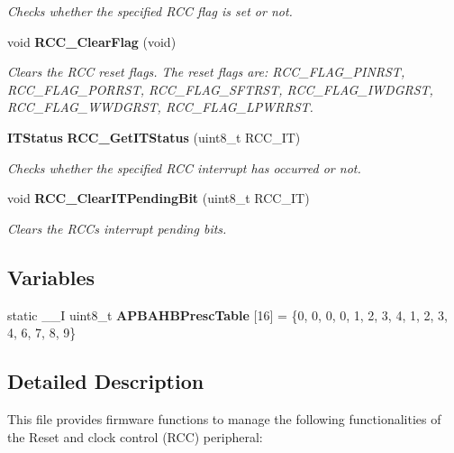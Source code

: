 \begin{DoxyCompactItemize}
\begin{DoxyCompactList}\small\item\em Checks whether the specified R\+CC flag is set or not. \end{DoxyCompactList}\item 
void \textbf{ R\+C\+C\+\_\+\+Clear\+Flag} (void)
\begin{DoxyCompactList}\small\item\em Clears the R\+CC reset flags. The reset flags are\+: R\+C\+C\+\_\+\+F\+L\+A\+G\+\_\+\+P\+I\+N\+R\+ST, R\+C\+C\+\_\+\+F\+L\+A\+G\+\_\+\+P\+O\+R\+R\+ST, R\+C\+C\+\_\+\+F\+L\+A\+G\+\_\+\+S\+F\+T\+R\+ST, R\+C\+C\+\_\+\+F\+L\+A\+G\+\_\+\+I\+W\+D\+G\+R\+ST, R\+C\+C\+\_\+\+F\+L\+A\+G\+\_\+\+W\+W\+D\+G\+R\+ST, R\+C\+C\+\_\+\+F\+L\+A\+G\+\_\+\+L\+P\+W\+R\+R\+ST. \end{DoxyCompactList}\item 
\textbf{ I\+T\+Status} \textbf{ R\+C\+C\+\_\+\+Get\+I\+T\+Status} (uint8\+\_\+t R\+C\+C\+\_\+\+IT)
\begin{DoxyCompactList}\small\item\em Checks whether the specified R\+CC interrupt has occurred or not. \end{DoxyCompactList}\item 
void \textbf{ R\+C\+C\+\_\+\+Clear\+I\+T\+Pending\+Bit} (uint8\+\_\+t R\+C\+C\+\_\+\+IT)
\begin{DoxyCompactList}\small\item\em Clears the R\+CC\textquotesingle{}s interrupt pending bits. \end{DoxyCompactList}\end{DoxyCompactItemize}
\subsection*{Variables}
\begin{DoxyCompactItemize}
\item 
static \+\_\+\+\_\+I uint8\+\_\+t \textbf{ A\+P\+B\+A\+H\+B\+Presc\+Table} [16] = \{0, 0, 0, 0, 1, 2, 3, 4, 1, 2, 3, 4, 6, 7, 8, 9\}
\end{DoxyCompactItemize}


\subsection{Detailed Description}
This file provides firmware functions to manage the following functionalities of the Reset and clock control (R\+CC) peripheral\+: 

